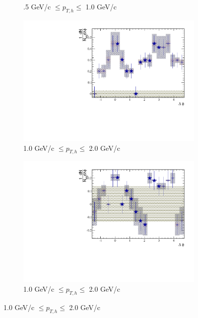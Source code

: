 \begin{figure}[htbp]
\begin{subfigure}{0.5\textwidth}
		\caption{.5 GeV/c $\leq p_{T,h} \leq$ 1.0 GeV/c}
		\label{fig:EP_corr_subtracted_b}
	\end{subfigure}	
	\begin{subfigure}{0.5\textwidth}
		\includegraphics[width=\textwidth]{Plots/Correlations/EP/subtracted/NPE_subtracted_eh_corr_inplane_primpt_4_5_cent_2_5_assopt_2_2.pdf}
		\caption{1.0 GeV/c $\leq p_{T,h} \leq$ 2.0 GeV/c}
		\label{fig:EP_corr_subtracted_c}
	\end{subfigure}	
	\begin{subfigure}{0.5\textwidth}
		\includegraphics[width=\textwidth]{Plots/Correlations/EP/subtracted/NPE_subtracted_eh_corr_outplane_primpt_4_5_cent_2_5_assopt_2_2.pdf}
		\caption{1.0 GeV/c $\leq p_{T,h} \leq$ 2.0 GeV/c}
		\label{fig:EP_corr_subtracted_d}
	\end{subfigure}	

\end{figure}
